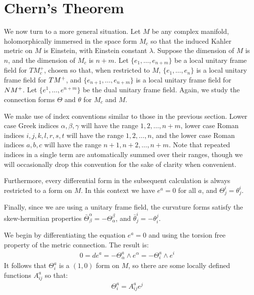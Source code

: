 \section{Chern's Theorem}

We now turn to a more general situation.  Let $M$ be any complex manifold, holomorphically immersed in the space form $M_c$ so that the induced Kahler metric on $M$ is Einstein, with Einstein constant $\lambda$.  Suppose the dimension of $M$ is $n$, and the dimension of $M_c$ is $n+m$.  Let $\{ e_1, \ldots, e_{n+m} \}$ be a local unitary frame field for $TM_c^{+}$, chosen so that, when restricted to $M$, $\{ e_1, \ldots, e_n \}$ is a local unitary frame field for $TM^{+}$, and $\{ e_{n+1}, \ldots, e_{n+m} \}$ is a local unitary frame field for $NM^+$.  Let $\{ e^1, \ldots, e^{n+m} \}$ be the dual unitary frame field.  Again, we study the connection forms $\Theta$ and $\theta$ for $M_c$ and $M$.

\begin{remark}  We make use of index conventions similar to those in the previous section.  Lower case Greek indices $\alpha, \beta, \gamma$ will have the range $1,2, \ldots, n+m$, lower case Roman indices $i,j,k,l,r,s,t$ will have the range $1,2, \ldots, n$, and the lower case Roman indices $a,b,c$ will have the range $n+1, n+2, \ldots, n+m$.  Note that repeated indices in a single term are automatically summed over their ranges, though we will occasionally drop this convention for the sake of clarity when convenient.

Furthermore, every differential form in the subsequent calculation is always restricted to a form on $M$. In this context we have $e^a = 0$ for all $a$, and $\Theta^i_j = \theta^i_j$.

Finally, since we are using a unitary frame field, the curvature forms satisfy the skew-hermitian properties $\bar{\Theta}^{\alpha}_{\beta} = - \Theta^{\beta}_{\alpha}$, and $\bar{\theta}^i_j = - \theta^j_i$.
\end{remark}

We begin by differentiating the equation $e^a = 0$ and using the torsion free property of the metric connection.  The result is:
%
\begin{align*}
0 = d e^a = - \Theta^a_{\alpha} \wedge e^{\alpha} = - \Theta^a_i \wedge e^i
\end{align*}
%
It follows that $\Theta^a_i$ is a $(1,0)$ form on $M$, so there are some locally defined functions $A^a_{ij}$ so that:
%
\begin{align}
\Theta^a_i = A^a_{ij} e^j
\end{align}

